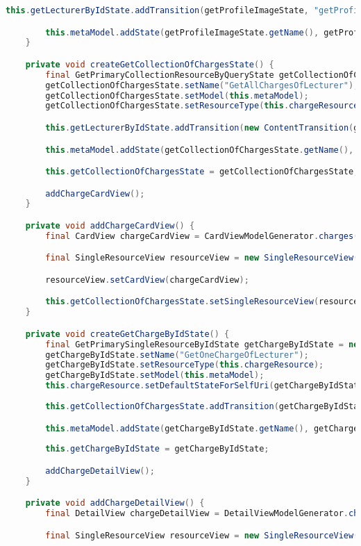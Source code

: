 \begin{lstlisting}[label=lst:enfield_model,
language=java,
firstnumber=1,
caption=Beschreibung des \textit{Enfield-Modell} der Referenzimplementierung. ]
		this.getLecturerByIdState.addTransition(getProfileImageState, "getProfileImage");

		this.metaModel.addState(getProfileImageState.getName(), getProfileImageState);
	}

	private void createGetCollectionOfChargesState() {
		final GetPrimaryCollectionResourceByQueryState getCollectionOfChargesState = new GetPrimaryCollectionResourceByQueryState();
		getCollectionOfChargesState.setName("GetAllChargesOfLecturer");
		getCollectionOfChargesState.setModel(this.metaModel);
		getCollectionOfChargesState.setResourceType(this.chargeResource);

		this.getLecturerByIdState.addTransition(new ContentTransition(getCollectionOfChargesState));

		this.metaModel.addState(getCollectionOfChargesState.getName(), getCollectionOfChargesState);

		this.getCollectionOfChargesState = getCollectionOfChargesState;

		addChargeCardView();
	}

	private void addChargeCardView() {
		final CardView chargeCardView = CardViewModelGenerator.charges();

		final SingleResourceView resourceView = new SingleResourceView();

		resourceView.setCardView(chargeCardView);

		this.getCollectionOfChargesState.setSingleResourceView(resourceView);
	}

	private void createGetChargeByIdState() {
		final GetPrimarySingleResourceByIdState getChargeByIdState = new GetPrimarySingleResourceByIdState();
		getChargeByIdState.setName("GetOneChargeOfLecturer");
		getChargeByIdState.setResourceType(this.chargeResource);
		getChargeByIdState.setModel(this.metaModel);
		this.chargeResource.setDefaultStateForSelfUri(getChargeByIdState);
		
		this.getCollectionOfChargesState.addTransition(getChargeByIdState);

		this.metaModel.addState(getChargeByIdState.getName(), getChargeByIdState);
	
		this.getChargeByIdState = getChargeByIdState;

		addChargeDetailView();
	}

	private void addChargeDetailView() {
		final DetailView chargeDetailView = DetailViewModelGenerator.charge();

		final SingleResourceView resourceView = new SingleResourceView();


\end{lstlisting}
